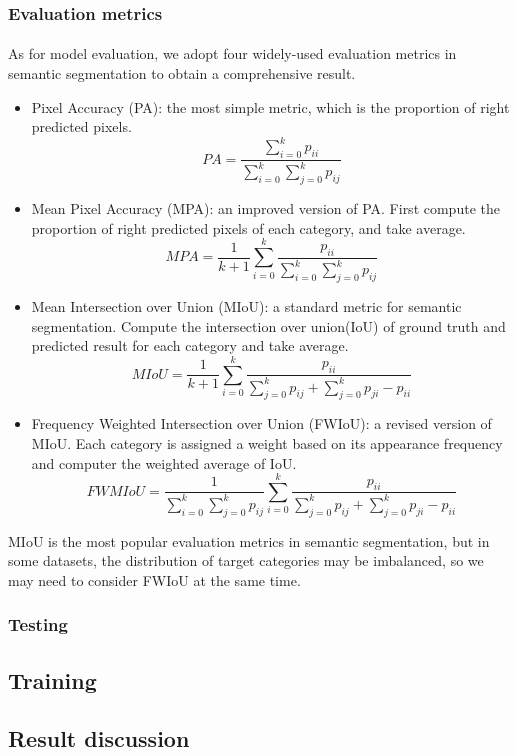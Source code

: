 \subsubsection{Evaluation metrics}
\paragraph{}
As for model evaluation, we adopt four widely-used evaluation metrics in semantic segmentation to obtain a comprehensive result.
\begin{itemize}
    \item Pixel Accuracy (PA): the most simple metric, which is the proportion of right predicted pixels. \[PA = \frac{\sum_{i=0}^k{p_{ii}}}{\sum_{i=0}^k\sum_{j=0}^k{p_{ij}}}\] 
    \item Mean Pixel Accuracy (MPA): an improved version of PA. First compute the proportion of right predicted pixels of each category, and take average. \[MPA = \frac{1}{k+1}\sum_{i=0}^k\frac{p_{ii}}{\sum_{i=0}^k\sum_{j=0}^k{p_{ij}}}\] 
    \item Mean Intersection over Union (MIoU): a standard metric for semantic segmentation. Compute the intersection over union(IoU) of ground truth and predicted result for each category and take average. \[MIoU = \frac{1}{k+1}\sum_{i=0}^k\frac{{p_{ii}}}{\sum_{j=0}^k{p_{ij}}+\sum_{j=0}^k{p_{ji}}-p_{ii}}\]
    \item Frequency Weighted Intersection over Union (FWIoU): a revised version of MIoU. Each category is assigned a weight based on its appearance frequency and computer the weighted average of IoU. \[FWMIoU = \frac{1}{\sum_{i=0}^k\sum_{j=0}^k{p_{ij}}}\sum_{i=0}^k\frac{{p_{ii}}}{\sum_{j=0}^k{p_{ij}}+\sum_{j=0}^k{p_{ji}}-p_{ii}}\]
\end{itemize}
MIoU is the most popular evaluation metrics in semantic segmentation, but in some datasets, the distribution of target categories may be imbalanced, so we may need to consider FWIoU at the same time.
\subsubsection{Testing}
\paragraph{}
\subsection{Training}
\paragraph{}
\subsection{Result discussion}
\paragraph{}
\newpage
